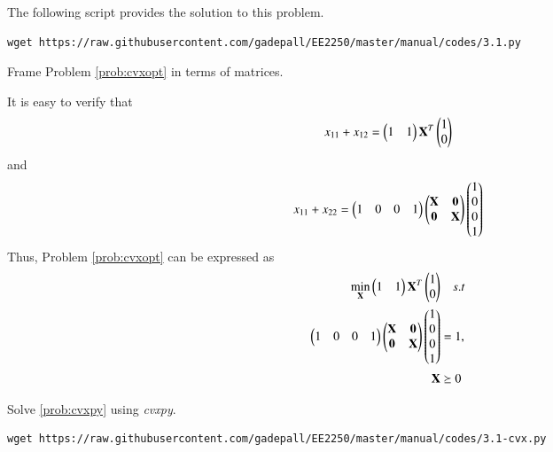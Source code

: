 \documentclass[journal,12pt,twocolumn]{IEEEtran}
\begin{document}
%
The following script provides the solution to this problem.
\begin{lstlisting}
wget https://raw.githubusercontent.com/gadepall/EE2250/master/manual/codes/3.1.py
\end{lstlisting}
%
\begin{problem}
Frame Problem \ref{prob:cvxopt} in terms of matrices.
\end{problem}
\solution
It is easy to verify that
\begin{equation}
x_{11} + x_{12} = 
\begin{pmatrix}
1 & 1
\end{pmatrix}
\mathbf{X}^{T}
\begin{pmatrix}
1 
\\
0
\end{pmatrix}
\end{equation}
and
\begin{equation}
x_{11} + x_{22} = 
\begin{pmatrix}
1 & 0 & 0 & 1
\end{pmatrix}
\begin{pmatrix}
\mathbf{X} & \mathbf{0} \\
\mathbf{0} & \mathbf{X}
\end{pmatrix}
\begin{pmatrix}
1
\\
0 
\\
0
\\
1
\end{pmatrix}
\end{equation}
%
Thus, Problem \ref{prob:cvxopt} can be expressed as
\begin{equation}
\begin{split}
\min_{\mathbf{X}} 
\begin{pmatrix}
1 & 1
\end{pmatrix}
\mathbf{X}^{T}
\begin{pmatrix}
1 
\\
0
\end{pmatrix}
& \quad s.t
\\
\begin{pmatrix}
1 & 0 & 0 & 1
\end{pmatrix}
\begin{pmatrix}
\mathbf{X} & \mathbf{0} \\
\mathbf{0} & \mathbf{X}
\end{pmatrix}
\begin{pmatrix}
1
\\
0 
\\
0
\\
1
\end{pmatrix}
&=1,
\\
\mathbf{X}
 & \succeq 0 
\end{split}
\label{prob:cvxpy}
\end{equation}
%	
\begin{problem}
Solve \eqref{prob:cvxpy} using {\em cvxpy}.
\end{problem}
%
\solution
\begin{lstlisting}
wget https://raw.githubusercontent.com/gadepall/EE2250/master/manual/codes/3.1-cvx.py
\end{lstlisting}
\end{document}
